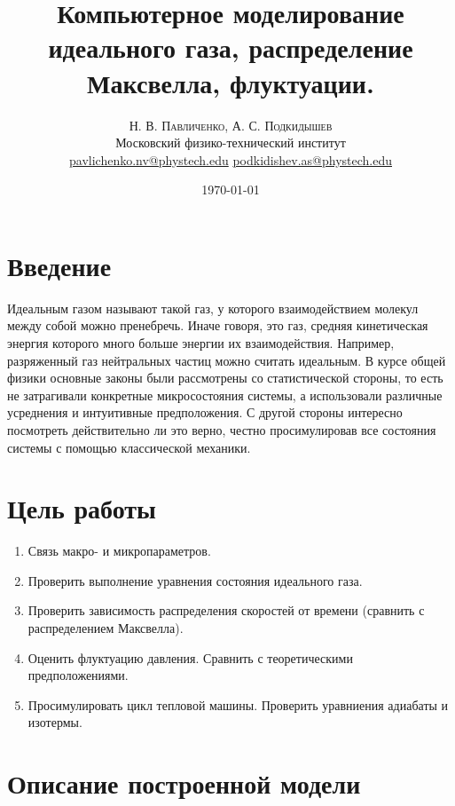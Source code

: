 \documentclass[twoside,twocolumn, 11pt]{article}
\title{Компьютерное моделирование идеального газа, распределение Максвелла, флуктуации.} %
\author{%
\textsc{Н. В. Павличенко, А. С. Подкидышев} \\[1ex] %
\normalsize Московский физико-технический институт \\ %
\normalsize \href{mailto:pavlichenko.nv@phystech.edu}{pavlichenko.nv@phystech.edu}
\href{mailto:pavlichenko.nv@phystech.edu}{podkidishev.as@phystech.edu}%
}
\date{\today} %
\theoremstyle{plain}
\theoremstyle{definition}
\begin{document}
\maketitle
\section{Введение}

\indent Идеальным газом называют такой газ, у которого взаимодействием молекул между собой можно пренебречь. Иначе говоря, это газ,
средняя кинетическая энергия которого много больше энергии их взаимодействия. Например, разряженный газ нейтральных частиц можно считать идеальным.
В курсе общей физики основные законы были рассмотрены со статистической стороны, то есть не затрагивали конкретные микросостояния системы,
а использовали различные усреднения и интуитивные предположения. С другой стороны интересно посмотреть действительно ли это верно, честно просимулировав все состояния
системы с помощью классической механики.

\section{Цель работы}

\begin{enumerate}
\item Связь макро- и микропараметров.
\item Проверить выполнение уравнения состояния идеального газа.
\item Проверить зависимость распределения скоростей от времени (сравнить с распределением Максвелла).
\item Оценить флуктуацию давления. Сравнить с теоретическими предположениями.
\item Просимулировать цикл тепловой машины. Проверить уравниения адиабаты и изотермы.
\end{enumerate}

\section{Описание построенной модели}
\end{document}
